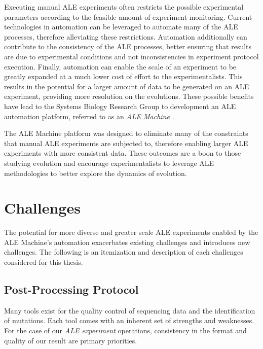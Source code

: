 \documentclass[12pt,final,masters,chapterheads]{ucsd}  %
\begin{document}
Executing manual ALE experiments often restricts the possible experimental parameters according to the feasible amount of experiment monitoring. Current technologies in automation can be leveraged to automate many of the ALE processes, therefore alleviating these restrictions. Automation additionally can contribute to the consistency of the ALE processes, better ensuring that results are due to experimental conditions and not inconsistencies in experiment protocol execution. Finally, automation can enable the scale of an experiment to be greatly expanded at a much lower cost of effort to the experimentalists. This results in the potential for a larger amount of data to be generated on an ALE experiment, providing more resolution on the evolutions. These possible benefits have lead to the Systems Biology Research Group to development an ALE automation platform, referred to as an \textit{ALE Machine} \cite{ryan_thesis}.

The ALE Machine platform was designed to eliminate many of the constraints that manual ALE experiments are subjected to, therefore enabling larger ALE experiments with more consistent data. These outcomes are a boon to those studying evolution and encourage experimentalists to leverage ALE methodologies to better explore the dynamics of evolution.

\section{Challenges}

% 
% 

The potential for more diverse and greater scale ALE experiments enabled by the ALE Machine's automation exacerbates existing challenges and introduces new challenges. The following is an itemization and description of each challenges considered for this thesis.

\subsection{Post-Processing Protocol}

Many tools exist for the quality control of sequencing data and the identification of mutations. Each tool comes with an inherent set of strengths and weaknesses. For the case of our \textit{ALE experiment} operations, consistency in the format and quality of our result are primary priorities. %
\end{document}
